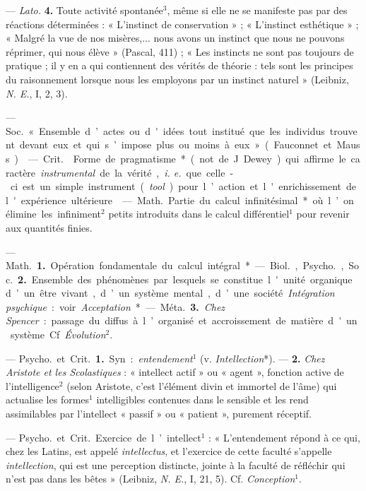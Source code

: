 \begin{itemize}[leftmargin=1cm, label=, itemsep=1pt]
— {\it Lato.} {\bf 4.} Toute activité spontanée$^3$, même si elle ne se
manifeste pas par des réactions déterminées : « L'instinct de
conservation » ; « L'instinct esthétique » ; « Malgré la vue de nos
misères,... nous avons un instinct que nous ne pouvons réprimer, qui nous
élève » (Pascal, 411) ; « Les instincts ne sont pas toujours de pratique ; il
y en a qui contiennent des vérités de théorie : tels sont les principes du
raisonnement lorsque nous les employons par un instinct naturel » (Leibniz,
{\it N. E.}, I, 2, 3).

 — \si{Soc.} « Ensemble d’actes ou d'idées tout institué que
les individus trouvent devant eux et qui s’impose plus ou moins à
eux » (Fauconnet et Mauss).

 — \si{Crit.}  Forme de pragmatisme* (not.
de J. Dewey) qui affirme le caractère {\it instrumental} de la vérité,
{\it i. e.} que celle-ci est un simple instrument ({\it tool}) pour l’action
et l'enrichissement de l'expérience ultérieure.

 — \si{Math.} Partie du calcul infinitésimal* où l’on
élimine
les infiniment$^2$ petits introduits dans le calcul différentiel$^1$ pour
revenir aux quantités finies.

 — \si{Math.} {\bf 1.} Opération fondamentale du calcul
intégral*. — \si{Biol.}, \si{Psycho.}, \si{Soc.} {\bf 2.} Ensemble des phénomènes
par lesquels se constitue l'unité organique d’un être vivant, d’un système
mental, d’une société. {\it Intégration psychique} : voir {\it Acceptation}*.
— \si{Méta.} {\bf 3.} {\it Chez Spencer} : passage du diffus à l’organisé et
accroissement de matière d'un système. Cf. {\it Évolution}$^2$.

 — \si{Psycho.} et \si{Crit.} {\bf 1.} Syn. :
{\it entendement}$^1$ (v. {\it Intellection}*). —  {\bf 2.} {\it Chez Aristote
et les Scolastiques} : « intellect actif » ou « agent », fonction active de
l'intelligence$^2$ (selon Aristote, c’est l'élément divin et immortel de
l’âme) qui actualise les formes$^1$ intelligibles contenues dans le sensible
et les rend assimilables par l'intellect « passif » ou « patient », purement
réceptif.

 — \si{Psycho.} et \si{Crit.} Exercice de l’intellect$^1$ :
« L’entendement répond à ce qui, chez les Latins, est appelé
{\it intellectus}, et l'exercice de cette faculté s’appelle
{\it intellection}, qui est une perception distincte, jointe à la faculté de
réfléchir qui n’est pas dans les bêtes » (Leibniz, {\it N. E.}, I, 21, 5).
Cf. {\it Conception}$^1$.


\end{itemize}
